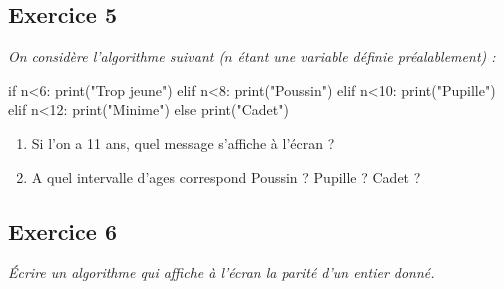 \documentclass[10pt]{article}
\newif\ifprof
\begin{document}
\subsection*{Exercice 5}
\textit{On considère l'algorithme suivant ($n$ étant une variable définie préalablement) :}
\begin{py}
\begin{python}
if n<6:
  print("Trop jeune")
elif n<8:
  print("Poussin") 
elif n<10: 
  print("Pupille") 
elif n<12:
  print("Minime") 
else 
  print("Cadet") 
\end{python} 
\end{py}


\begin{enumerate}
\item Si l'on a 11 ans, quel message s'affiche à l'écran ?
\item A quel intervalle d'ages correspond Poussin ? Pupille ? Cadet ?
\end{enumerate}


\ifprof
\begin{corrige}
\begin{enumerate}
\item Si l'on a 11 ans, quel message s'affiche à l'écran ?\\
Il s'affiche "Minime".
\item A quel intervalle d'ages correspondent Poussin, Pupille et Cadet ?\\ 
Poussin : 6 $\leqslant$ age< 8\\
Pupille : 8 $\leqslant$ age< 10\\
Cadet : age $\geqslant$ 12\\
\end{enumerate}

\end{corrige}
\else
\fi






\subsection*{Exercice 6}
\textit{Écrire un algorithme qui affiche à l'écran la parité d'un entier donné.}


\ifprof
\begin{corrige}
\begin{py}
\begin{python}
x=522
if(x%
    print("Valeur impaire !")
else:
    print("Valeur paire !")
\end{python}

\end{py}
\end{corrige}
\else
\fi
\end{document}
